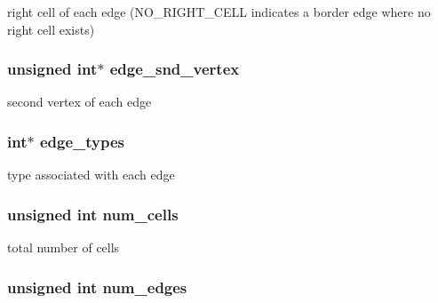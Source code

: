right cell of each edge (NO\_\-RIGHT\_\-CELL indicates a border edge where no right cell exists) 

\hypertarget{structFVL_1_1CFVMesh2D__cuda_a656712266e15816d723aae1c64411c52}{
\subsubsection[{edge\_\-snd\_\-vertex}]{\setlength{\rightskip}{0pt plus 5cm}unsigned int$\ast$ {\bf edge\_\-snd\_\-vertex}}}
\label{dd/d46/structFVL_1_1CFVMesh2D__cuda_a656712266e15816d723aae1c64411c52}


second vertex of each edge 

\hypertarget{structFVL_1_1CFVMesh2D__cuda_a6a62f4029cdd76f0ca586851d6eaf684}{
\subsubsection[{edge\_\-types}]{\setlength{\rightskip}{0pt plus 5cm}int$\ast$ {\bf edge\_\-types}}}
\label{dd/d46/structFVL_1_1CFVMesh2D__cuda_a6a62f4029cdd76f0ca586851d6eaf684}


type associated with each edge 

\hypertarget{structFVL_1_1CFVMesh2D__cuda_aede6f897b05f909a426f36f61b2b8d43}{
\subsubsection[{num\_\-cells}]{\setlength{\rightskip}{0pt plus 5cm}unsigned int {\bf num\_\-cells}}}
\label{dd/d46/structFVL_1_1CFVMesh2D__cuda_aede6f897b05f909a426f36f61b2b8d43}


total number of cells 

\hypertarget{structFVL_1_1CFVMesh2D__cuda_ad1228ae08a3c287de40e4682e6538c12}{
\subsubsection[{num\_\-edges}]{\setlength{\rightskip}{0pt plus 5cm}unsigned int {\bf num\_\-edges}}}
\label{dd/d46/structFVL_1_1CFVMesh2D__cuda_ad1228ae08a3c287de40e4682e6538c12}


